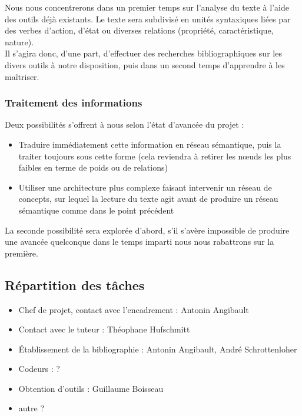 \documentclass{article}           %
\begin{document}
Nous nous concentrerons dans un premier temps sur l'analyse du texte à l'aide des outils déjà existants. Le texte sera subdivisé en unités syntaxiques liées par des verbes d'action, d'état ou diverses relations (propriété, caractéristique, nature).\\

Il s'agira donc, d'une part, d'effectuer des recherches bibliographiques sur les divers outils à notre disposition, puis dans un second temps d'apprendre à les ma\^{i}triser.

\subsubsection{Traitement des informations}

Deux possibilités s'offrent à nous selon l'état d'avancée du projet :\\
\begin{itemize}
 \item Traduire immédiatement cette information en réseau sémantique, puis la traiter toujours sous cette forme (cela reviendra à retirer les nœuds les plus faibles en terme de poids ou de relations)
 \item Utiliser une architecture plus complexe faisant intervenir un réseau de concepts, sur lequel la lecture du texte agit avant de produire un réseau sémantique comme dans le point précédent 
\end{itemize}
La seconde possibilité sera explorée d'abord, s'il s'avère impossible de produire une avancée quelconque dans le temps imparti nous nous rabattrons sur la première.

\subsection{Répartition des tâches}%
\begin{itemize}
	\item Chef de projet, contact avec l'encadrement : Antonin Angibault
	\item Contact avec le tuteur : Théophane Hufschmitt
	\item Établissement de la bibliographie : Antonin Angibault, André Schrottenloher
	\item Codeurs : ?
	\item Obtention d'outils : Guillaume Boisseau
	\item autre ?
\end{itemize}
\end{document}
